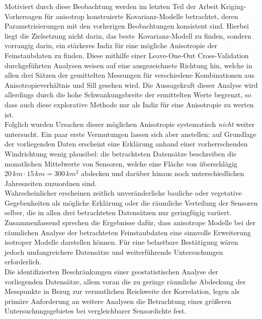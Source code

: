 Motiviert durch diese Beobachtung werden im letzten Teil der Arbeit 
Kriging-Vorhersagen für anisotrop konstruierte Ko\-va\-ri\-anz-Modelle 
betrachtet, deren Parametrisierungen mit den vorherigen Beobachtungen 
konsistent sind. Hierbei liegt die Zielsetzung nicht darin, das \glqq beste\grqq\ Kovarianz-Modell zu finden, sondern vorrangig darin, ein
stärkeres Indiz für eine mögliche Anisotropie der Feinstaubdaten zu finden. 
 Diese mithilfe einer Leave-One-Out Cross-Validation
durchgeführten Analysen weisen auf eine ausgezeichnete Richtung hin,
welche in allen drei Sätzen der gemittelten Messungen für 
verschiedene Kombinationen aus Anisotropieverhältnis und Sill gesehen
 wird. Die Aussagekraft dieser Analyse wird allerdings durch die
hohe Schwankungsbreite der ermittelten Werte begrenzt, so dass 
auch diese explorative Methode nur als Indiz für eine Anisotropie zu 
werten ist. \\

Folglich wurden Ursachen dieser möglichen Anisotropie systematisch 
\textit{nicht} weiter untersucht.
Ein paar erste Vermutungen lassen sich aber anstellen:
auf Grundlage der vorliegenden Daten erscheint eine 
Erklärung anhand einer vorherrschenden Windrichtung wenig plausibel:
die betrachteten Datensätze beschreiben die monatlichen Mittelwerte von 
Sensoren, welche eine Fläche von überschlägig $20\,km \cdot 15\,km=300\,km^2$
abdecken und darüber hinaus noch unterschiedlichen Jahreszeiten zuzuordnen sind. \\
Wahrscheinlicher erscheinen zeitlich unveränderliche bauliche
oder vegetative Gegebenheiten als mögliche Erklärung oder 
die räumliche Verteilung der Sensoren selber, die in allen drei 
betrachteten Datensätzen nur geringfügig variiert.\\

Zusammenfassend sprechen die Ergebnisse dafür, dass anisotrope Modelle bei
der räum\-li\-chen Analyse der betrachteten Feinstaubdaten eine sinnvolle
Erweiterung isotroper Modelle darstellen können. Für eine belastbare
Bestätigung wären jedoch umfangreichere Datensätze und weiterführende
 Untersuchungen erforderlich.\\

Die identifizierten Beschränkungen einer geostatistischen Analyse der vorliegenden Datensätze, allem 
voran die zu geringe räumliche Abdeckung der Messpunkte in Bezug 
zur vermutlichen Reichweite der Korrelation, legen als primäre 
Anforderung an weitere Analysen die Betrachtung eines größeren 
Untersuchungsgebietes bei vergleichbarer Sensordichte fest. \\

